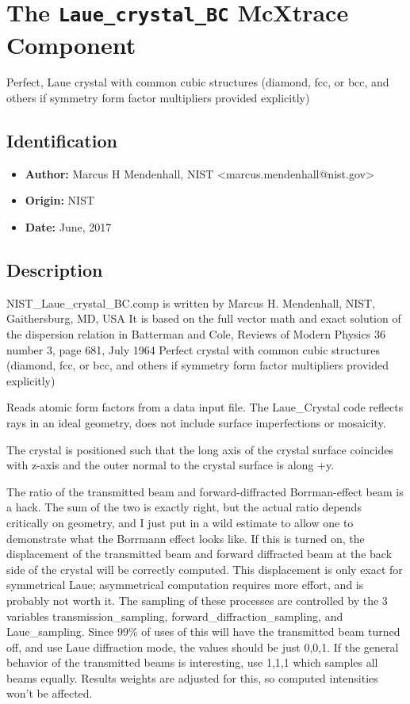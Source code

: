 \section{The \texttt{Laue\_crystal\_BC} McXtrace Component}
Perfect, Laue crystal with common cubic structures (diamond, fcc, or bcc, and others if symmetry form factor multipliers provided explicitly)

\subsection*{Identification}
\begin{itemize}
  \item \textbf{Author:} Marcus H Mendenhall, NIST \textless{}marcus.mendenhall@nist.gov\textgreater{}
  \item \textbf{Origin:} NIST
  \item \textbf{Date:} June, 2017
\end{itemize}

\subsection*{Description}
NIST\_Laue\_crystal\_BC.comp is written by Marcus H. Mendenhall, NIST, Gaithersburg, MD, USA It is based on the full vector math and exact solution of the dispersion relation in Batterman and Cole, Reviews of Modern Physics 36 number 3, page 681, July 1964 Perfect crystal with common cubic structures (diamond, fcc, or bcc, and others if symmetry form factor multipliers provided explicitly)

Reads atomic form factors from a data input file. The Laue\_Crystal code reflects rays in an ideal geometry, does not include surface imperfections or mosaicity.

The crystal is positioned such that the long axis of the crystal surface coincides with z-axis and the outer normal to the crystal surface is along +y.

The ratio of the transmitted beam and forward-diffracted Borrman-effect beam is a hack. The sum of the two is exactly right, but the actual ratio depends critically on geometry, and I just put in a wild estimate to allow one to demonstrate what the Borrmann effect looks like. If this is turned on, the displacement of the transmitted beam and forward diffracted beam at the back side of the crystal will be correctly computed. This displacement is only exact for symmetrical Laue; asymmetrical computation requires more effort, and is probably not worth it. The sampling of these processes are controlled by the 3 variables transmission\_sampling, forward\_diffraction\_sampling, and Laue\_sampling. Since 99\% of uses of this will have the transmitted beam turned off, and use Laue diffraction mode, the values should be just 0,0,1. If the general behavior of the transmitted beams is interesting, use 1,1,1 which samples all beams equally. Results weights are adjusted for this, so computed intensities won't be affected.

